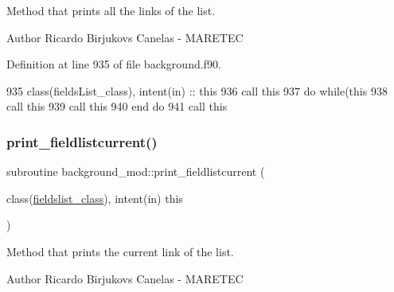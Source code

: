Method that prints all the links of the list. 

\begin{DoxyAuthor}{Author}
Ricardo Birjukovs Canelas -\/ M\+A\+R\+E\+T\+EC 
\end{DoxyAuthor}


Definition at line 935 of file background.\+f90.


\begin{DoxyCode}
935     \textcolor{keywordtype}{class}(fieldsList\_class), \textcolor{keywordtype}{intent(in)} :: this
936     \textcolor{keyword}{call }this%
937     \textcolor{keywordflow}{do} \textcolor{keywordflow}{while}(this%
938         \textcolor{keyword}{call }this%
939         \textcolor{keyword}{call }this%
940 \textcolor{keywordflow}{    end do}
941     \textcolor{keyword}{call }this%
\end{DoxyCode}
\mbox{\label{namespacebackground__mod_a2bd18f3830c0667741efd086d36753db}} 
\subsubsection{\texorpdfstring{print\+\_\+fieldlistcurrent()}{print\_fieldlistcurrent()}}
{\footnotesize\ttfamily subroutine background\+\_\+mod\+::print\+\_\+fieldlistcurrent (\begin{DoxyParamCaption}\item[{class(\mbox{\hyperlink{structbackground__mod_1_1fieldslist__class}{fieldslist\+\_\+class}}), intent(in)}]{this }\end{DoxyParamCaption})\hspace{0.3cm}{\ttfamily [private]}}



Method that prints the current link of the list. 

\begin{DoxyAuthor}{Author}
Ricardo Birjukovs Canelas -\/ M\+A\+R\+E\+T\+EC 
\end{DoxyAuthor}


